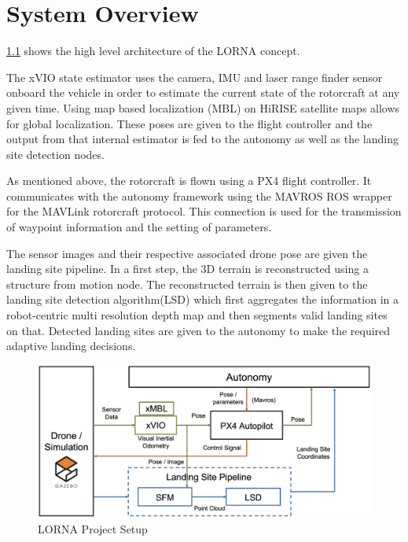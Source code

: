 \chapter{System Overview}

\cref{fig:lorna_setup} shows the high level architecture of the LORNA concept. 

The xVIO state estimator uses the camera, IMU and laser range finder sensor onboard the vehicle in order to estimate the current state of the rotorcraft at any given time. Using map based localization (MBL) on HiRISE satellite maps allows for global localization. These poses are given to the flight controller and the output from that internal estimator is fed to the autonomy as well as the landing site detection nodes.

As mentioned above, the rotorcraft is flown using a PX4 flight controller. It communicates with the autonomy framework using the MAVROS ROS wrapper for the MAVLink rotorcraft protocol. This connection is used for the transmission of waypoint information and the setting of parameters.

The sensor images and their respective associated drone pose are given the landing site pipeline. In a first step, the 3D terrain is reconstructed using a structure from motion node. The reconstructed terrain is then given to the landing site detection algorithm(LSD) which first aggregates the information in a robot-centric multi resolution depth map and then segments valid landing sites on that. Detected landing sites are given to the autonomy to make the required adaptive landing decisions.



\begin{figure}[ht]
    \centering
    \includegraphics[scale=0.18]{images/system_overview/setup_flowchart_with_vio.png}
    \caption{LORNA Project Setup}
    \label{fig:lorna_setup}
\end{figure}

